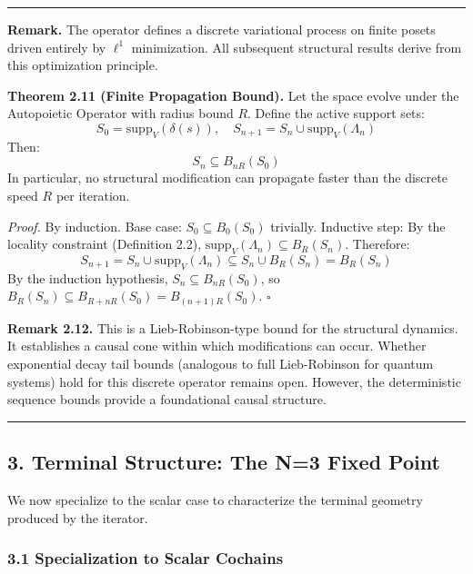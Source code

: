 \documentclass[
]{article}
\begin{document}
\begin{center}\rule{0.5\linewidth}{0.5pt}\end{center}

\textbf{Remark.} The operator defines a discrete variational process on
finite posets driven entirely by \(\ell^1\) minimization. All subsequent
structural results derive from this optimization principle.

\textbf{Theorem 2.11 (Finite Propagation Bound).} Let the space evolve
under the Autopoietic Operator with radius bound \(R\). Define the
active support sets:
\[S_0 = \mathrm{supp}_V(\delta(s)), \quad S_{n+1} = S_n \cup \mathrm{supp}_V(\Lambda_n)\]
Then: \[S_n \subseteq B_{nR}(S_0)\] In particular, no structural
modification can propagate faster than the discrete speed \(R\) per
iteration.

\emph{Proof.} By induction. Base case: \(S_0 \subseteq B_0(S_0)\)
trivially. Inductive step: By the locality constraint (Definition 2.2),
\(\mathrm{supp}_V(\Lambda_n) \subseteq B_R(S_n)\). Therefore:
\[S_{n+1} = S_n \cup \mathrm{supp}_V(\Lambda_n) \subseteq S_n \cup B_R(S_n) = B_R(S_n)\]
By the induction hypothesis, \(S_n \subseteq B_{nR}(S_0)\), so
\(B_R(S_n) \subseteq B_{R + nR}(S_0) = B_{(n+1)R}(S_0)\). \(\square\)

\textbf{Remark 2.12.} This is a Lieb-Robinson-type bound for the
structural dynamics. It establishes a causal cone within which
modifications can occur. Whether exponential decay tail bounds
(analogous to full Lieb-Robinson for quantum systems) hold for this
discrete operator remains open. However, the deterministic sequence
bounds provide a foundational causal structure.

\begin{center}\rule{0.5\linewidth}{0.5pt}\end{center}

\subsection{3. Terminal Structure: The N=3 Fixed
Point}\label{terminal-structure-the-n3-fixed-point}

We now specialize to the scalar case to characterize the terminal
geometry produced by the iterator.

\subsubsection{3.1 Specialization to Scalar
Cochains}\label{specialization-to-scalar-cochains}
\end{document}
